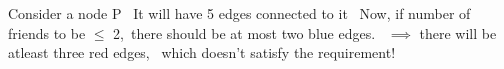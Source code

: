 \documentclass[preview]{standalone}
\begin{document}
\begin{center}
Consider a node P \ It will have 5 edges connected to it \ Now, if number of friends to be $\le$ 2,\ there should be at most two blue edges. \ $\implies$ there will be atleast three red edges, \ which doesn't satisfy the requirement!
\end{center}
\end{document}
